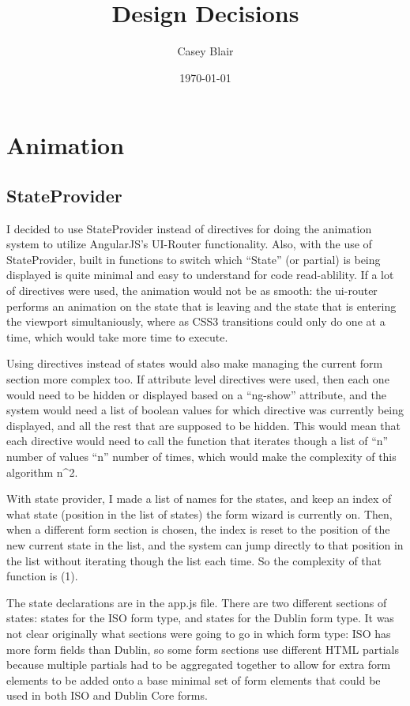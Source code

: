 \documentclass[a4paper, 12pt]{article}
\title{Design Decisions}
\author{Casey Blair}
\date{\today}
\begin{document}
\maketitle

\section{Animation}
\subsection{StateProvider}
\par\indent
I decided to use StateProvider instead of directives for doing the animation system to utilize AngularJS's UI-Router functionality. Also, with the use of StateProvider, built in functions to switch which ``State'' (or partial) is being displayed is quite minimal and easy to understand for code read-ablility. If a lot of directives were used, the animation would not be as smooth: the ui-router performs an animation on the state that is leaving and the state that is entering the viewport simultaniously, where as CSS3 transitions could only do one at a time, which would take more time to execute.

\par\indent
Using directives instead of states would also make managing the current form section more complex too. If attribute level directives were used, then each one would need to be hidden or displayed based on a ``ng-show'' attribute, and the system would need a list of boolean values for which directive was currently being displayed, and all the rest that are supposed to be hidden. This would mean that each directive would need to call the function that iterates though a list of ``n'' number of values ``n'' number of times, which would make the complexity of this algorithm n^2.

\par\indent
With state provider, I made a list of names for the states, and keep an index of what state (position in the list of states) the form wizard is currently on. Then, when a different form section is chosen, the index is reset to the position of the new current state in the list, and the system can jump directly to that position in the list without iterating though the list each time. So the complexity of that function is \theta (1).
 
\par\indent
The state declarations are in the app.js file. There are two different sections of states: states for the ISO form type, and states for the Dublin form type. It was not clear originally what sections were going to go in which form type: ISO has more form fields than Dublin, so some form sections use different HTML partials because multiple partials had to be aggregated together to allow for extra form elements to be added onto a base minimal set of form elements that could be used in both ISO and Dublin Core forms.
\end{document}
